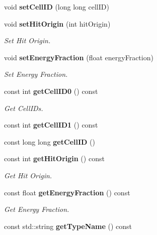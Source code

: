 \begin{DoxyCompactItemize}
\item 
void {\bfseries set\-Cell\-I\-D} (long long cell\-I\-D)\label{classCALICE_1_1MergedHitOrigin_a6c44d5f76c7c72579406f53fa5bf9e21}

\item 
void {\bf set\-Hit\-Origin} (int hit\-Origin)\label{classCALICE_1_1MergedHitOrigin_ac0c792c65a1f6822e6805ed8d8faa4f3}

\begin{DoxyCompactList}\small\item\em Set Hit Origin. \end{DoxyCompactList}\item 
void {\bf set\-Energy\-Fraction} (float energy\-Fraction)\label{classCALICE_1_1MergedHitOrigin_afec9b730dca85aea7b6468db13837423}

\begin{DoxyCompactList}\small\item\em Set Energy Fraction. \end{DoxyCompactList}\item 
const int {\bf get\-Cell\-I\-D0} () const \label{classCALICE_1_1MergedHitOrigin_ae90525cf6ea5cfca242ab32f2e1f8336}

\begin{DoxyCompactList}\small\item\em Get Cell\-I\-Ds. \end{DoxyCompactList}\item 
const int {\bfseries get\-Cell\-I\-D1} () const \label{classCALICE_1_1MergedHitOrigin_ac47d48b8f6e565ce425c079f46c94e1f}

\item 
const long long {\bfseries get\-Cell\-I\-D} ()\label{classCALICE_1_1MergedHitOrigin_aaff2282cfba858b5f0b4d3fc648d1277}

\item 
const int {\bf get\-Hit\-Origin} () const \label{classCALICE_1_1MergedHitOrigin_a1fc28ac7438a487774be0d1bee9e5f21}

\begin{DoxyCompactList}\small\item\em Get Hit Origin. \end{DoxyCompactList}\item 
const float {\bf get\-Energy\-Fraction} () const \label{classCALICE_1_1MergedHitOrigin_ab7b9cd8ed5fa3974a76b8bc9010b88b1}

\begin{DoxyCompactList}\small\item\em Get Energy Fraction. \end{DoxyCompactList}\item 
const std\-::string {\bf get\-Type\-Name} () const \label{classCALICE_1_1MergedHitOrigin_a4dcd0ab0ab7a5ca7bb6ea5b34bde2567}


\end{DoxyCompactItemize}
